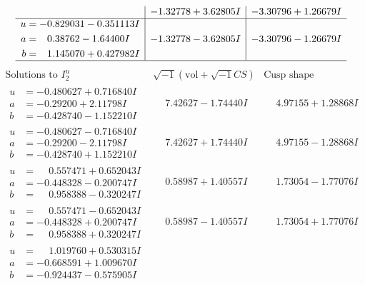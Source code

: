 \documentclass[1p]{elsarticle_modified}
\theoremstyle{definition}
\newcommand{\I}{\sqrt{-1}}
\begin{document}
$$\begin{array}{c|c|c}
 & -1.32778 + 3.62805 I & -3.30796 + 1.26679 I \\ \hline\begin{aligned}
u &= -0.829031 - 0.351113 I \\
a &= \phantom{-}0.38762 - 1.64400 I \\
b &= \phantom{-}1.145070 + 0.427982 I\end{aligned}
 & -1.32778 - 3.62805 I & -3.30796 - 1.26679 I\\
 \hline 
 \end{array}$$\newpage$$\begin{array}{c|c|c}  
\text{Solutions to }I^u_{2}& \I (\text{vol} + \sqrt{-1}CS) & \text{Cusp shape}\\
 \hline 
\begin{aligned}
u &= -0.480627 + 0.716840 I \\
a &= -0.29200 + 2.11798 I \\
b &= -0.428740 - 1.152210 I\end{aligned}
 & \phantom{-}7.42627 - 1.74440 I & \phantom{-}4.97155 + 1.28868 I \\ \hline\begin{aligned}
u &= -0.480627 - 0.716840 I \\
a &= -0.29200 - 2.11798 I \\
b &= -0.428740 + 1.152210 I\end{aligned}
 & \phantom{-}7.42627 + 1.74440 I & \phantom{-}4.97155 - 1.28868 I \\ \hline\begin{aligned}
u &= \phantom{-}0.557471 + 0.652043 I \\
a &= -0.448328 - 0.200747 I \\
b &= \phantom{-}0.958388 - 0.320247 I\end{aligned}
 & \phantom{-}0.58987 + 1.40557 I & \phantom{-}1.73054 - 1.77076 I \\ \hline\begin{aligned}
u &= \phantom{-}0.557471 - 0.652043 I \\
a &= -0.448328 + 0.200747 I \\
b &= \phantom{-}0.958388 + 0.320247 I\end{aligned}
 & \phantom{-}0.58987 - 1.40557 I & \phantom{-}1.73054 + 1.77076 I \\ \hline\begin{aligned}
u &= \phantom{-}1.019760 + 0.530315 I \\
a &= -0.668591 + 1.009670 I \\
b &= -0.924437 - 0.575905 I\end{aligned}

\end{array}$$
\end{document}
